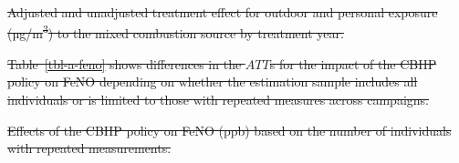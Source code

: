 \documentclass[
  letterpaper,
  DIV=11,
  numbers=noendperiod]{scrartcl}
\makeatletter
\renewenvironment{table}%
   {\renewcommand\familydefault\sfdefault
    \@float{table}}
   {\end@float}
\providecommand{\DIFdeltex}[1]{{\protect\color{red}\sout{#1}}}                      %
\providecommand{\DIFdelFL}[1]{\DIFdel{#1}} %
\providecommand{\DIFdel}[1]{\texorpdfstring{\DIFdeltex{#1}}{}} %
\makeatother
\begin{document}


{%
\DIFdelFL{Adjusted and unadjusted treatment
effect for outdoor and personal exposure (µg/m\textsuperscript{3}) to
the mixed combustion source by treatment year.}}




\DIFdel{Table~\ref{tbl-a-feno} shows differences in the \(ATT\)s for the impact
of the CBHP policy on FeNO depending on whether the estimation sample
includes all individuals or is limited to those with repeated measures
across campaigns.
}%

{%
\DIFdelFL{Effects of the CBHP policy on FeNO (ppb) based on the number of
individuals with repeated measurements. }}%
\end{document}

